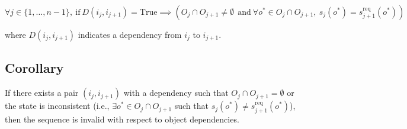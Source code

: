 \documentclass[a4paper,11pt]{lmcs}
\begin{document}
\[
\forall j \in \{1, \ldots, n-1\},\
\text{if}\ D(i_j, i_{j+1}) = \text{True}
\implies
\left( O_j \cap O_{j+1} \neq \emptyset\
\ \text{and}\
\forall o^* \in O_j \cap O_{j+1},\ s_j(o^*) = s_{j+1}^{\mathrm{req}}(o^*) \right)
\]

where $D(i_j, i_{j+1})$ indicates a dependency from $i_j$ to $i_{j+1}$.

\subsection*{Corollary}

If there exists a pair $(i_j, i_{j+1})$ with a dependency such that $O_j \cap O_{j+1} = \emptyset$
or the state is inconsistent (i.e., $\exists o^* \in O_j \cap O_{j+1}$ such that $s_j(o^*) \neq s_{j+1}^{\mathrm{req}}(o^*)$),
then the sequence is invalid with respect to object dependencies.
\end{document}
